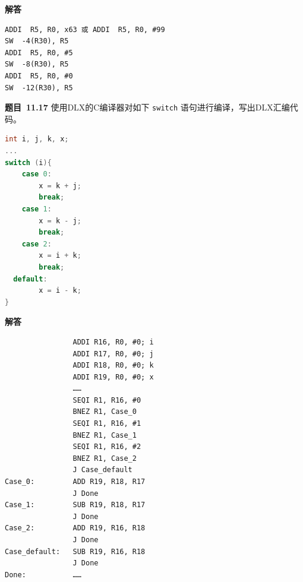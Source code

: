 \documentclass[10pt,a4paper,UTF8]{ctexart}
\newcommand{\problemname}{待定义}
\newenvironment{problem}{\begin{shaded}\par\noindent\textbf{题目\  \problemname}}{\end{shaded}\par}
\newenvironment{solution}{\par\noindent\textbf{解答}\ }{\par}
\begin{document}
\begin{solution}
	\begin{lstlisting}
ADDI  R5, R0, x63 或 ADDI  R5, R0, #99
SW  -4(R30), R5
ADDI  R5, R0, #5
SW  -8(R30), R5
ADDI  R5, R0, #0
SW  -12(R30), R5
	\end{lstlisting}
\end{solution}


\renewcommand{\problemname}{11.17}
\begin{problem}
	使用DLX的C编译器对如下 \verb|switch| 语句进行编译，写出DLX汇编代码。
	\begin{lstlisting}[language=C]
int i, j, k, x;
...
switch (i){
	case 0:
		x = k + j;
   		break;
	case 1:
    	x = k - j;
    	break;
  	case 2:
    	x = i + k;
    	break;
  default:
    	x = i - k;
}
	\end{lstlisting}
\end{problem}

\begin{solution}
	\begin{lstlisting}
				ADDI R16, R0, #0; i
				ADDI R17, R0, #0; j
				ADDI R18, R0, #0; k
				ADDI R19, R0, #0; x
				……
				SEQI R1, R16, #0
				BNEZ R1, Case_0
				SEQI R1, R16, #1
				BNEZ R1, Case_1
				SEQI R1, R16, #2
				BNEZ R1, Case_2
				J Case_default
Case_0:			ADD R19, R18, R17
				J Done
Case_1:			SUB R19, R18, R17
				J Done
Case_2:			ADD R19, R16, R18
				J Done
Case_default:	SUB R19, R16, R18
				J Done
Done:			……
	\end{lstlisting}
\end{solution}
\end{document}
